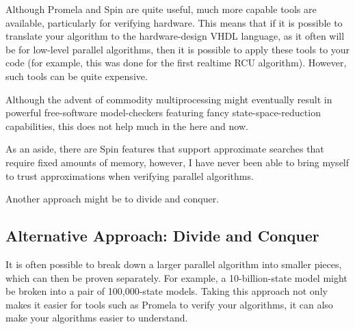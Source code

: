 Although Promela and Spin are quite useful,
much more capable tools are available, particularly for verifying
hardware.
This means that if it is possible to translate your algorithm
to the hardware-design VHDL language, as it often will be for
low-level parallel algorithms, then it is possible to apply these
tools to your code (for example, this was done for the first
realtime RCU algorithm).
However, such tools can be quite expensive.

Although the advent of commodity multiprocessing
might eventually result in powerful free-software model-checkers
featuring fancy state-space-reduction capabilities,
this does not help much in the here and now.

As an aside, there are Spin features that support approximate searches
that require fixed amounts of memory, however, I have never been able
to bring myself to trust approximations when verifying parallel
algorithms.

Another approach might be to divide and conquer.

\subsection{Alternative Approach: Divide and Conquer}
\label{app:formal:Alternative Approach: Divide and Conquer}

It is often possible to break down a larger parallel algorithm into
smaller pieces, which can then be proven separately.
For example, a 10-billion-state model might be broken into a pair
of 100,000-state models.
Taking this approach not only makes it easier for tools such as
Promela to verify your algorithms, it can also make your algorithms
easier to understand.
